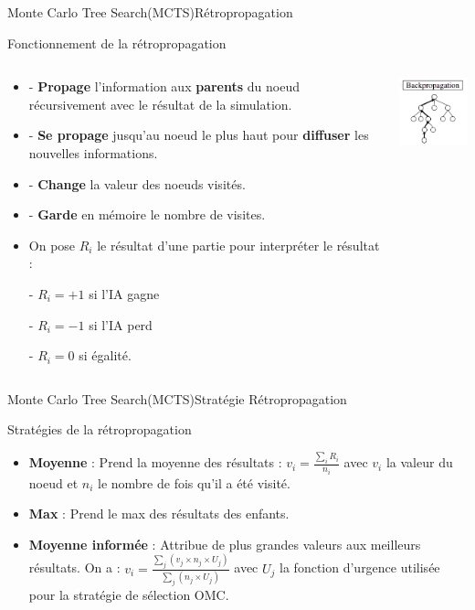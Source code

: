 \begin{frame}{Monte Carlo Tree Search(MCTS)}{Rétropropagation}
	\begin{block}{Fonctionnement de la rétropropagation}
		\begin{columns}
			\begin{column}{8cm}
				\begin{itemize}
					\item - \textbf{Propage} l'information aux \textbf{parents} du noeud récursivement avec le résultat de la simulation.
					\item - \textbf{Se propage} jusqu'au noeud le plus haut pour \textbf{diffuser} les nouvelles informations.
					\item - \textbf{Change} la valeur des noeuds visités.
					\item - \textbf{Garde} en mémoire le nombre de visites.
					\item  On pose $R_{i}$ le résultat d'une partie pour interpréter le résultat :

					      - $R_{i} = +1$ si l'IA gagne

					      - $R_{i} = -1$ si l'IA perd

					      - $R_{i} = 0$ si égalité.
				\end{itemize}
			\end{column}
			\begin{column}{4cm}
				\includegraphics[width=3cm]{ressources/MCTS/Backpropagation.png}
			\end{column}
		\end{columns}
	\end{block}
\end{frame}

\begin{frame}{Monte Carlo Tree Search(MCTS)}{Stratégie Rétropropagation}
	\begin{block}{Stratégies de la rétropropagation}
		\begin{itemize}
			\item \textbf{Moyenne} : Prend la moyenne des résultats : $v_{i} = \frac{\sum_{i}^{}R_{i}}{n_{i}}$ avec $v_{i}$ la valeur du noeud et $n_i$ le nombre de fois qu'il a été visité.
			\item \textbf{Max} : Prend le max des résultats des enfants.
			\item \textbf{Moyenne informée} : Attribue de plus grandes valeurs aux meilleurs résultats.
			      On a : $v_{i} = \frac{\sum_{j}^{}(v_{j}\times n_{j}\times U_{j})}{\sum_{j}^{}(n_{j}\times U_{j})}$ avec $U_{j}$ la fonction d'urgence utilisée pour la stratégie de sélection OMC.
		\end{itemize}
	\end{block}
\end{frame}

